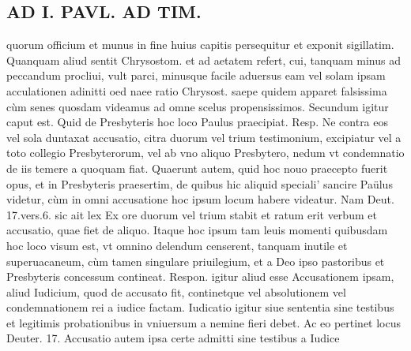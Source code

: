 \documentclass{article}
\begin{document}
\begin{pages}
\section*{AD I. PAVL. AD TIM. }
\marginpar{[ p.34. ]}\pstart quorum officium et munus in fine huius capitis persequitur et exponit sigillatim. Quanquam aliud sentit Chrysostom. et ad aetatem refert, cui, tanquam minus ad peccandum procliui, vult parci, minusque  facile aduersus eam vel solam ipsam acculationen adinitti oed naee ratio Chrysost. saepe quidem apparet falsissima cùm senes quosdam videamus ad omne scelus propensissimos.  \pend\pstart Secundum igitur caput est. Quid de Presbyteris hoc loco Paulus praecipiat. Resp. Ne contra eos vel sola duntaxat accusatio, citra duorum vel trium testimonium, excipiatur vel a toto collegio Presbyterorum, vel ab vno aliquo Presbytero, nedum vt condemnatio de iis temere a quoquam fiat. Quaerunt autem, quid hoc nouo praecepto fuerit opus, et in Presbyteris praesertim, de quibus hic aliquid speciali' sancire Paülus videtur, cùm in omni accusatione hoc ipsum locum habere videatur. Nam Deut. 17.vers.6. sic ait lex Ex ore duorum vel trium stabit et ratum erit verbum et accusatio, quae fiet de aliquo. Itaque hoc ipsum tam leuis momenti quibusdam hoc loco visum est, vt omnino delendum censerent, tanquam inutile et superuacaneum, cùm tamen singulare priuilegium, et a Deo ipso pastoribus et Presbyteris concessum contineat. Respon. igitur aliud esse Accusationem ipsam, aliud Iudicium, quod de accusato fit, continetque vel absolutionem vel condemnationem rei a iudice factam. Iudicatio igitur siue sententia sine testibus et legitimis probationibus in vniuersum a nemine fieri debet. Ac eo pertinet locus Deuter. 17. Accusatio autem ipsa certe admitti sine testibus a Iudice  \pend

\end{pages}
\end{document}
